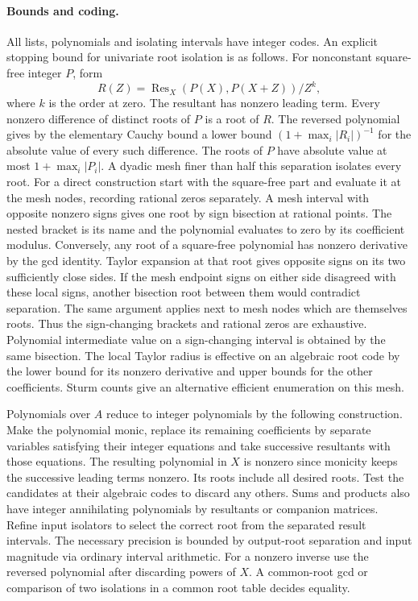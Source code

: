 \documentclass[10pt,letterpaper]{article}
\begin{document}
\paragraph{Bounds and coding.}
All lists, polynomials and isolating intervals have integer codes.
An explicit stopping bound for univariate root isolation is as follows.
For nonconstant square-free integer $P$, form
\[
 R(Z)=\operatorname{Res}_X(P(X),P(X+Z))/Z^k ,
\]
where $k$ is the order at zero. The resultant has nonzero leading
term. Every nonzero difference of distinct roots of $P$ is a root of
$R$. The reversed polynomial gives by the elementary Cauchy bound a
lower bound $(1+\max_i|R_i|)^{-1}$ for the absolute value of every
such difference. The roots of $P$ have absolute value at most
$1+\max_i|P_i|$. A dyadic mesh finer than half this separation
isolates every root. For a direct construction start with the
square-free part and evaluate it at the mesh nodes, recording rational
zeros separately. A mesh interval with opposite nonzero signs gives
one root by sign bisection at rational points. The nested bracket is
its name and the polynomial evaluates to zero by its coefficient
modulus. Conversely, any root of a square-free polynomial has
nonzero derivative by the gcd identity. Taylor expansion at that
root gives opposite signs on its two sufficiently close sides. If
the mesh endpoint signs on either side disagreed with these local
signs, another bisection root between them would contradict
separation. The same argument applies next to mesh nodes which are
themselves roots. Thus the sign-changing brackets and rational zeros
are exhaustive. Polynomial intermediate value on a sign-changing
interval is obtained by the same bisection. The local Taylor radius
is effective on an algebraic root code by the lower bound for its
nonzero derivative and upper bounds for the other coefficients.
Sturm counts give an alternative efficient enumeration on this mesh.

Polynomials over $A$ reduce to integer polynomials by the following construction. Make the
polynomial monic, replace its remaining coefficients by separate
variables satisfying their integer equations and take successive
resultants with those equations. The resulting polynomial in $X$
is nonzero since monicity keeps the successive leading terms
nonzero. Its roots include all desired roots. Test the candidates at
their algebraic codes to discard any others. Sums and products also
have integer annihilating polynomials by resultants or companion
matrices. Refine input isolators to select the correct root from
the separated result intervals. The necessary precision is bounded
by output-root separation and input magnitude via ordinary interval
arithmetic. For a nonzero inverse use the reversed polynomial after
discarding powers of $X$. A common-root gcd or comparison of two
isolations in a common root table decides equality.
\end{document}
